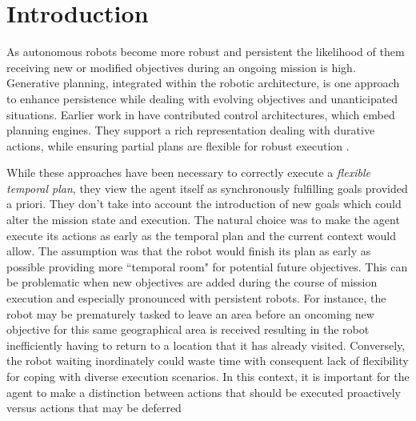 \section{Introduction}
\label{sec:intro}

As autonomous robots become more robust and persistent the likelihood
of them receiving new or modified objectives during an ongoing
mission is high. Generative planning, integrated within the robotic
architecture, is one approach to enhance
persistence while dealing with evolving objectives and unanticipated situations.  Earlier work in
\cite{AmbrosIngerson88,Haigh98,alami:1998p820,mus98,chien99,mus04,py10}
have contributed control architectures, which embed planning engines.
They support a rich representation dealing with durative
actions, while ensuring partial plans are flexible for robust execution
\cite{lemai-chenevier2004}.


While these approaches have been necessary to correctly execute a
\emph{flexible temporal plan}, they view the agent itself as
synchronously fulfilling goals provided a priori. They don't take into account the
introduction of new goals which could alter the mission state and
execution.
The natural choice was to make the agent execute its actions as early
as the temporal plan and the current context would allow. The
assumption was that the robot would finish its plan as early as possible
providing more ``temporal room" for potential future objectives.  This
can be problematic when new objectives are added during the course of
mission execution and especially pronounced with persistent
robots. For instance, the robot may be prematurely tasked to leave an
area before an oncoming new objective for this same geographical area
is received resulting in the robot inefficiently having to return to a
location that it has already visited. Conversely, the robot waiting
inordinately could waste time with consequent lack of flexibility for
coping with diverse execution scenarios. In this context, it is
important for the agent to make a distinction between actions that should
be executed proactively versus actions that may be deferred

